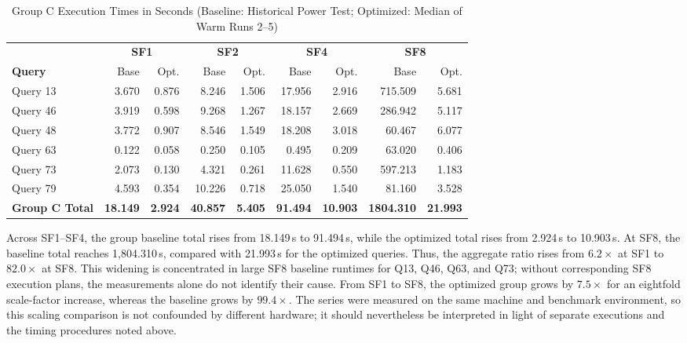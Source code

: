 \documentclass{ULBreport}
\begin{document}
\begin{table}[htbp]
\centering
\caption{Group C Execution Times in Seconds (Baseline: Historical Power Test; Optimized: Median of Warm Runs 2--5)}
\label{tab:group_c_times}
\small
\setlength{\tabcolsep}{4pt}
\begin{tabular}{@{}lrrrrrrrr@{}}
\toprule
 & \multicolumn{2}{c}{\textbf{SF1}} & \multicolumn{2}{c}{\textbf{SF2}} & \multicolumn{2}{c}{\textbf{SF4}} & \multicolumn{2}{c}{\textbf{SF8}} \\
\cmidrule(lr){2-3} \cmidrule(lr){4-5} \cmidrule(lr){6-7} \cmidrule(l){8-9}
\textbf{Query} & Base & Opt. & Base & Opt. & Base & Opt. & Base & Opt. \\ \midrule
Query 13 & 3.670 & 0.876 & 8.246 & 1.506 & 17.956 & 2.916 & 715.509 & 5.681 \\
Query 46 & 3.919 & 0.598 & 9.268 & 1.267 & 18.157 & 2.669 & 286.942 & 5.117 \\
Query 48 & 3.772 & 0.907 & 8.546 & 1.549 & 18.208 & 3.018 & 60.467 & 6.077 \\
Query 63 & 0.122 & 0.058 & 0.250 & 0.105 & 0.495 & 0.209 & 63.020 & 0.406 \\
Query 73 & 2.073 & 0.130 & 4.321 & 0.261 & 11.628 & 0.550 & 597.213 & 1.183 \\
Query 79 & 4.593 & 0.354 & 10.226 & 0.718 & 25.050 & 1.540 & 81.160 & 3.528 \\ \midrule
\textbf{Group C Total} & \textbf{18.149} & \textbf{2.924} & \textbf{40.857} & \textbf{5.405} & \textbf{91.494} & \textbf{10.903} & \textbf{1804.310} & \textbf{21.993} \\ \bottomrule
\end{tabular}
\end{table}

Across SF1--SF4, the group baseline total rises from 18.149\,s to 91.494\,s, while the optimized total rises from 2.924\,s to 10.903\,s. At SF8, the baseline total reaches 1,804.310\,s, compared with 21.993\,s for the optimized queries. Thus, the aggregate ratio rises from $6.2\times$ at SF1 to $82.0\times$ at SF8. This widening is concentrated in large SF8 baseline runtimes for Q13, Q46, Q63, and Q73; without corresponding SF8 execution plans, the measurements alone do not identify their cause. From SF1 to SF8, the optimized group grows by $7.5\times$ for an eightfold scale-factor increase, whereas the baseline grows by $99.4\times$. The series were measured on the same machine and benchmark environment, so this scaling comparison is not confounded by different hardware; it should nevertheless be interpreted in light of separate executions and the timing procedures noted above.
\end{document}
